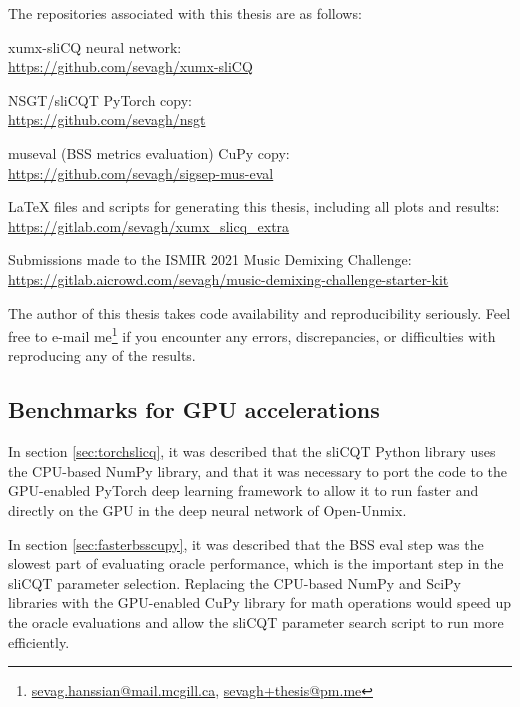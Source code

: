 \documentclass[report.tex]{subfiles}
\begin{document}
The repositories associated with this thesis are as follows:
\begin{tight_enumerate}
	\item
		xumx-sliCQ neural network:\\
		\url{https://github.com/sevagh/xumx-sliCQ}
	\item
		NSGT/sliCQT PyTorch copy:\\
		\url{https://github.com/sevagh/nsgt}
	\item
		museval (BSS metrics evaluation) CuPy copy:\\
		\url{https://github.com/sevagh/sigsep-mus-eval}
	\item
		LaTeX files and scripts for generating this thesis, including all plots and results:\\
		\url{https://gitlab.com/sevagh/xumx_slicq_extra}
	\item
		Submissions made to the ISMIR 2021 Music Demixing Challenge:\\
		\url{https://gitlab.aicrowd.com/sevagh/music-demixing-challenge-starter-kit}
\end{tight_enumerate}

The author of this thesis takes code availability and reproducibility seriously. Feel free to e-mail me\footnote{\href{mailto:sevag.hanssian@mail.mcgill.ca}{sevag.hanssian@mail.mcgill.ca}, \href{mailto:sevagh+thesis@pm.me}{sevagh+thesis@pm.me}} if you encounter any errors, discrepancies, or difficulties with reproducing any of the results.

\subsection{Benchmarks for GPU accelerations}

In section \ref{sec:torchslicq}, it was described that the sliCQT Python library uses the CPU-based NumPy library, and that it was necessary to port the code to the GPU-enabled PyTorch deep learning framework to allow it to run faster and directly on the GPU in the deep neural network of Open-Unmix.

In section \ref{sec:fasterbsscupy}, it was described that the BSS eval step was the slowest part of evaluating oracle performance, which is the important step in the sliCQT parameter selection. Replacing the CPU-based NumPy and SciPy libraries with the GPU-enabled CuPy library for math operations would speed up the oracle evaluations and allow the sliCQT parameter search script to run more efficiently.
\end{document}
